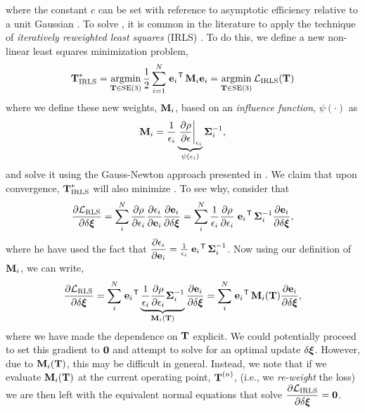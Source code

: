where the constant $c$ can be set with reference to asymptotic efficiency relative to a unit Gaussian \citep{Holland1977}. To solve , it is common in the literature to apply the technique of \textit{iteratively reweighted least squares} (IRLS) \citep{Holland1977}. To do this, we define a new non-linear least squares minimization problem,
\begin{equation}
\boldsymbol{\mathbf{T}}^*_{\text{IRLS}} = \operatorname*{argmin}_{\boldsymbol{\mathbf{T}}\in\text{SE}(3)}\frac{1}{2} \sum_{i=1}^{N} 
\left.{\boldsymbol{\mathbf{e}}_{i}}\right.^{\mkern-1.0mu\mathsf{T}} \boldsymbol{\mathbf{M}}_{i} \boldsymbol{\mathbf{e}}_{i} = \operatorname*{argmin}_{\boldsymbol{\mathbf{T}}\in\text{SE}(3)} \mathcal{L}_{\text{IRLS}}(\boldsymbol{\mathbf{T}})
\end{equation}
where we define these new weights, $\boldsymbol{\mathbf{M}}_{i}$, based on an \textit{influence function}, $\psi(\cdot)$ as
\begin{equation}
	\boldsymbol{\mathbf{M}}_i = \frac{1}{\epsilon_i} \underbrace{\left.\dfrac{\partial \rho}{\partial \epsilon}\right|_{\epsilon_i}}_{\psi(\epsilon_i)} \boldsymbol{\mathbf{\Sigma}}_{i}^{-1},
\end{equation}
and solve it using the Gauss-Newton approach presented in . We claim that upon convergence, $\boldsymbol{\mathbf{T}}^*_{\text{IRLS}}$ will also minimize . To see why, consider that
\begin{equation}
\dfrac{\partial \mathcal{L}_{\text{RLS}}}{\partial \delta \boldsymbol{\mathbf{\xi}}} = 	\sum_i^N \dfrac{\partial \rho}{\partial \epsilon_i} \dfrac{\partial \epsilon_i}{\partial \boldsymbol{\mathbf{e}}_i} \dfrac{\partial \boldsymbol{\mathbf{e}}_i}{\partial \delta \boldsymbol{\mathbf{\xi}}} = 	\sum_i^N \frac{1}{\epsilon_i} \dfrac{\partial \rho}{\partial \epsilon_i} \left.{\boldsymbol{\mathbf{e}}_{i}}\right.^{\mkern-1.0mu\mathsf{T}} \boldsymbol{\mathbf{\Sigma}}_{i}^{-1} \dfrac{\partial \boldsymbol{\mathbf{e}}_i}{\partial \delta \boldsymbol{\mathbf{\xi}}}, 
\end{equation} where he have used the fact that $\dfrac{\partial \epsilon_i}{\partial \boldsymbol{\mathbf{e}}_i} = \frac{1}{\epsilon_i} 	\left.{\boldsymbol{\mathbf{e}}_{i}}\right.^{\mkern-1.0mu\mathsf{T}} \boldsymbol{\mathbf{\Sigma}}_{i}^{-1}$. Now using our definition of $\boldsymbol{\mathbf{M}}_i$, we can write,
\begin{equation}
\dfrac{\partial \mathcal{L}_{\text{RLS}}}{\partial \delta \boldsymbol{\mathbf{\xi}}}  = 	\sum_i^N \left.{\boldsymbol{\mathbf{e}}_{i}}\right.^{\mkern-1.0mu\mathsf{T}} \underbrace{\frac{1}{\epsilon_i} \dfrac{\partial \rho}{\partial \epsilon_i}  \boldsymbol{\mathbf{\Sigma}}_{i}^{-1}}_{\boldsymbol{\mathbf{M}}_i(\boldsymbol{\mathbf{T}})} \dfrac{\partial \boldsymbol{\mathbf{e}}_i}{\partial \delta \boldsymbol{\mathbf{\xi}}} = \sum_i^N \left.{\boldsymbol{\mathbf{e}}_{i}}\right.^{\mkern-1.0mu\mathsf{T}} \boldsymbol{\mathbf{M}}_i(\boldsymbol{\mathbf{T}}) \dfrac{\partial \boldsymbol{\mathbf{e}}_i}{\partial \delta \boldsymbol{\mathbf{\xi}}}, 
\end{equation} where we have made the dependence on $\boldsymbol{\mathbf{T}}$ explicit. We could potentially proceed to set this gradient to $\boldsymbol{\mathbf{0}}$ and attempt to solve for an optimal update $\delta \boldsymbol{\mathbf{\xi}}$. However, due to $\boldsymbol{\mathbf{M}}_i(\boldsymbol{\mathbf{T}})$, this may be difficult in general.  Instead, we note that if we evaluate $\boldsymbol{\mathbf{M}}_i{(\boldsymbol{\mathbf{T}}})$ at the current operating point, $\boldsymbol{\mathbf{T}}^{(n)}$, (i.e., we \textit{re-weight} the loss) we are then left with the equivalent normal equations that solve $\dfrac{\partial \mathcal{L}_{\text{IRLS}}}{\partial \delta \boldsymbol{\mathbf{\xi}}} = \boldsymbol{\mathbf{0}}$.

